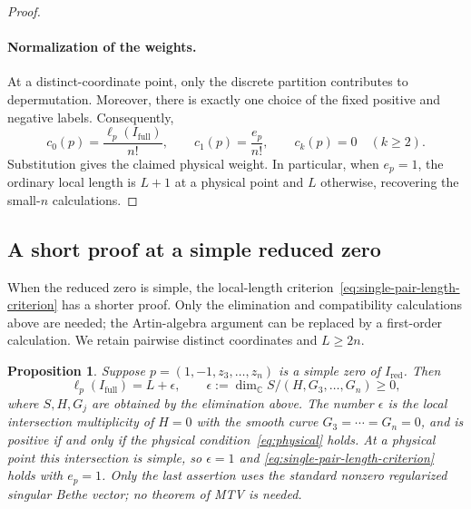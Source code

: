 \documentclass[11pt]{article}
\newtheorem{proposition}{Proposition}[section]
\theoremstyle{definition}
\newcommand{\C}{\mathbb C}
\begin{document}
\begin{proof}
\paragraph{Normalization of the weights.}
At a distinct-coordinate point, only the discrete partition
contributes to depermutation. Moreover, there is exactly one choice
of the fixed positive and negative labels. Consequently,
\[
 c_0(p)=\frac{\ell_p(I_{\mathrm{full}})}{n!},\qquad
 c_1(p)=\frac{e_p}{n!},\qquad c_k(p)=0\quad(k\ge2).
\]
Substitution gives the claimed physical weight. In particular, when
$e_p=1$, the ordinary local length is $L+1$ at a physical point and
$L$ otherwise, recovering the small-$n$ calculations.
\end{proof}

\subsection{A short proof at a simple reduced zero}
\label{sec:simple-reduced-one-pair}

When the reduced zero is simple, the local-length
criterion~\eqref{eq:single-pair-length-criterion} has a shorter
proof. Only the elimination and compatibility calculations above are
needed; the Artin-algebra argument can be replaced by a first-order
calculation. We retain pairwise distinct coordinates and $L\ge2n$.

\begin{proposition}\label{prop:simple-reduced-one-pair}
Suppose $p=(1,-1,z_3,\ldots,z_n)$ is a simple zero of
$I_{\mathrm{red}}$. Then
\[
 \ell_p(I_{\mathrm{full}})=L+\epsilon,\qquad
 \epsilon:=\dim_\C S/(H,G_3,\ldots,G_n)\ge0,
\]
where $S,H,G_j$ are obtained by the elimination above. The number
$\epsilon$ is the local intersection multiplicity of $H=0$ with
the smooth curve $G_3=\cdots=G_n=0$, and is positive if and only if
the physical condition~\eqref{eq:physical} holds. At a physical
point this intersection is simple, so $\epsilon=1$ and
\eqref{eq:single-pair-length-criterion} holds with $e_p=1$.
Only the last assertion uses the standard nonzero regularized
singular Bethe vector; no theorem of MTV is needed.
\end{proposition}
\end{document}
